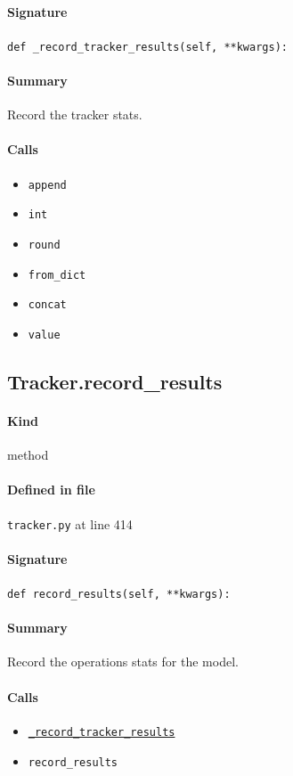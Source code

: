 \documentclass[11pt]{report}
\begin{document}
\paragraph{Signature} \texttt{def \_record\_tracker\_results(self, **kwargs):}
\paragraph{Summary} Record the tracker stats.
\paragraph{Calls}
\begin{itemize}[leftmargin=*]
  \item \texttt{append}
  \item \texttt{int}
  \item \texttt{round}
  \item \texttt{from\_dict}
  \item \texttt{concat}
  \item \texttt{value}
\end{itemize}
\subsection{Tracker.record\_results}
\label{def:tracker.py:Tracker.record_results:L414}
\paragraph{Kind} method
\paragraph{Defined in file} \texttt{tracker.py} at line 414
\paragraph{Signature} \texttt{def record\_results(self, **kwargs):}
\paragraph{Summary} Record the operations stats for the model.
\paragraph{Calls}
\begin{itemize}[leftmargin=*]
  \item \hyperref[def:tracker.py:Tracker._record_tracker_results:L375]{\texttt{\_record\_tracker\_results}}
  \item \texttt{record\_results}
\end{itemize}
\end{document}

